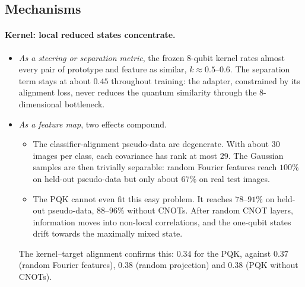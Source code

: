 \subsection{Mechanisms}

\paragraph{Kernel: local reduced states concentrate.}
\begin{itemize}
  \item \emph{As a steering or separation metric}, the frozen 8-qubit kernel
    rates almost every pair of prototype and feature as similar,
    $k\approx0.5$--$0.6$. The separation term stays at about $0.45$
    throughout training: the adapter, constrained by its alignment loss,
    never reduces the quantum similarity through the 8-dimensional
    bottleneck.
  \item \emph{As a feature map}, two effects compound.
    \begin{itemize}
      \item The classifier-alignment pseudo-data are degenerate. With about
        30 images per class, each covariance has rank at most 29. The
        Gaussian samples are then trivially separable: random Fourier
        features reach $100\%$ on held-out pseudo-data but only about $67\%$
        on real test images.
      \item The PQK cannot even fit this easy problem. It reaches $78$--$91\%$
        on held-out pseudo-data, $88$--$96\%$ without CNOTs. After random
        CNOT layers, information moves into non-local correlations, and the
        one-qubit states drift towards the maximally mixed state.
    \end{itemize}
    The kernel--target alignment confirms this: $0.34$ for the PQK, against
    $0.37$ (random Fourier features), $0.38$ (random projection) and $0.38$
    (PQK without CNOTs).
\end{itemize}


